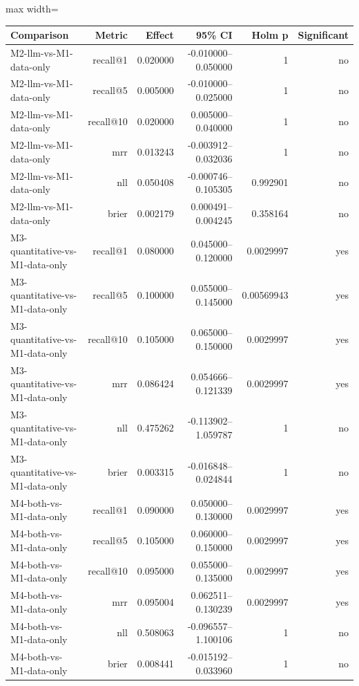 \begin{table}[!htbp]
\centering
\scriptsize
\setlength{\tabcolsep}{2.5pt}
\begin{adjustbox}{max width=\textwidth}
\begin{tabular}{@{}lrrrrr@{}}
\toprule
Comparison & Metric & Effect & 95\% CI & Holm p & Significant \\
\midrule
M2-llm-vs-M1-data-only & recall@1 & 0.020000 & -0.010000--0.050000 & 1 & no \\
M2-llm-vs-M1-data-only & recall@5 & 0.005000 & -0.010000--0.025000 & 1 & no \\
M2-llm-vs-M1-data-only & recall@10 & 0.020000 & 0.005000--0.040000 & 1 & no \\
M2-llm-vs-M1-data-only & mrr & 0.013243 & -0.003912--0.032036 & 1 & no \\
M2-llm-vs-M1-data-only & nll & 0.050408 & -0.000746--0.105305 & 0.992901 & no \\
M2-llm-vs-M1-data-only & brier & 0.002179 & 0.000491--0.004245 & 0.358164 & no \\
M3-quantitative-vs-M1-data-only & recall@1 & 0.080000 & 0.045000--0.120000 & 0.0029997 & yes \\
M3-quantitative-vs-M1-data-only & recall@5 & 0.100000 & 0.055000--0.145000 & 0.00569943 & yes \\
M3-quantitative-vs-M1-data-only & recall@10 & 0.105000 & 0.065000--0.150000 & 0.0029997 & yes \\
M3-quantitative-vs-M1-data-only & mrr & 0.086424 & 0.054666--0.121339 & 0.0029997 & yes \\
M3-quantitative-vs-M1-data-only & nll & 0.475262 & -0.113902--1.059787 & 1 & no \\
M3-quantitative-vs-M1-data-only & brier & 0.003315 & -0.016848--0.024844 & 1 & no \\
M4-both-vs-M1-data-only & recall@1 & 0.090000 & 0.050000--0.130000 & 0.0029997 & yes \\
M4-both-vs-M1-data-only & recall@5 & 0.105000 & 0.060000--0.150000 & 0.0029997 & yes \\
M4-both-vs-M1-data-only & recall@10 & 0.095000 & 0.055000--0.135000 & 0.0029997 & yes \\
M4-both-vs-M1-data-only & mrr & 0.095004 & 0.062511--0.130239 & 0.0029997 & yes \\
M4-both-vs-M1-data-only & nll & 0.508063 & -0.096557--1.100106 & 1 & no \\
M4-both-vs-M1-data-only & brier & 0.008441 & -0.015192--0.033960 & 1 & no \\

\end{tabular}
\end{adjustbox}
\end{table}
